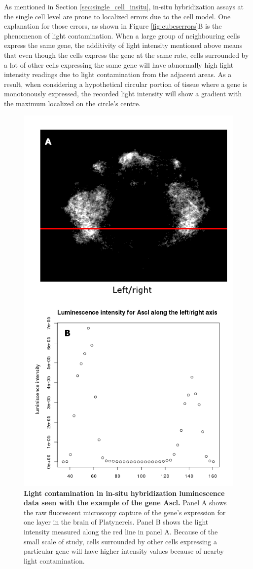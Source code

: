   As mentioned in Section \ref{sec:single_cell_insitu}, in-situ hybridization assays at the single cell level are prone to localized errors due to the cell model. One explanation for those errors, as shown in Figure \ref{fig:cubeserrors}B is the phenomenon of light contamination. When a large group of neighbouring cells express the same gene, the additivity of light intensity mentioned above means that even though the cells express the gene at the same rate, cells surrounded by a lot of other cells expressing the same gene will have abnormally high light intensity readings due to light contamination from the adjacent areas. As a result, when considering a hypothetical circular portion of tissue where a gene is monotonously expressed, the recorded light intensity will show a gradient with the maximum localized on the circle's centre.\\
  
   \begin{figure}[H]
\centerline{\includegraphics[width=0.8\linewidth]{gfx/chapter2/whybina.png}}
\caption{{\bf Light contamination in in-situ hybridization luminescence data seen with the example of the gene Ascl.} Panel A shows the raw fluorescent microscopy capture of the gene's expression for one layer in the brain of Platynereis. Panel B shows the light intensity measured along the red line in panel A. Because of the small scale of study, cells surrounded by other cells expressing a particular gene will have higher intensity values because of nearby light contamination.}\label{fig:why_binarize}
	\end{figure}
  

